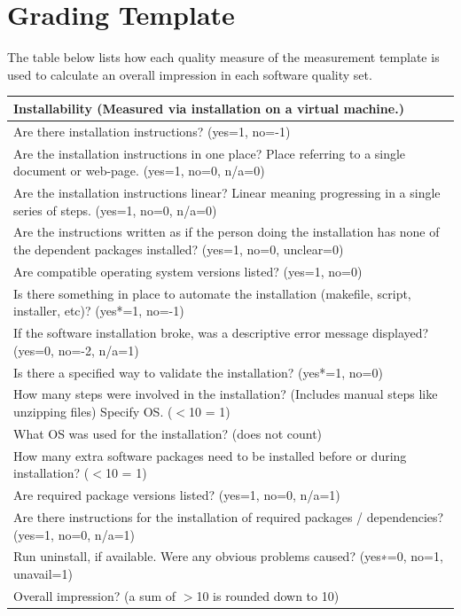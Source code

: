 \documentclass[12pt, notitlepage]{article}
\begin{document}
\begin{appendices}
\begin{singlespace}
\begin{enumerate}
\end{enumerate}

\newpage

\section{Grading Template}\label{gradingtemplate2}
The table below lists how each quality measure of the measurement template is used to calculate an overall impression in each software quality set.\newline

\label{gradingtemplate}
\def\arraystretch{1.5}
\begin{tabular}{p{14cm}}
	\hline		
	\textbf{Installability  (Measured via installation on a virtual machine.) }\\
	\hline
	Are there installation instructions? ({yes=1, no=-1})\\
	Are the installation instructions in one place? Place referring to a single document or web-page. ({yes=1, no=0, n/a=0})\\
	Are the installation instructions linear? Linear meaning progressing  in a single series of steps. ({yes=1, no=0, n/a=0})\\
	Are the instructions written as if the person doing the installation has none of the dependent packages installed? ({yes=1, no=0, unclear=0})\\
	Are compatible operating system versions listed? ({yes=1, no=0})\\
	Is there something in place to automate the installation (makefile, script, installer, etc)? ({yes*=1, no=-1})\\
	If the software installation broke, was a descriptive error message displayed? ({yes=0, no=-2, n/a=1})\\
	Is there a specified way to validate the installation? ({yes*=1, no=0})\\
	How many steps were involved in the installation? (Includes manual steps like unzipping files) Specify OS. ($<$10 = 1)\\
	What OS was used for the installation? (does not count)\\
	How many extra software packages need to be installed before or during installation? ($<$10 = 1)\\
	Are required package versions listed? ({yes=1, no=0, n/a=1})\\
	Are there instructions for the installation of required packages / dependencies? ({yes=1, no=0, n/a=1})\\
	Run uninstall, if available. Were any obvious problems caused? ({yes∗=0, no=1, unavail=1})\\
	Overall impression? (a sum of $>$10 is rounded down to 10)\\
	\hline
\end{tabular}


\end{singlespace}
\end{appendices}
\end{document}
